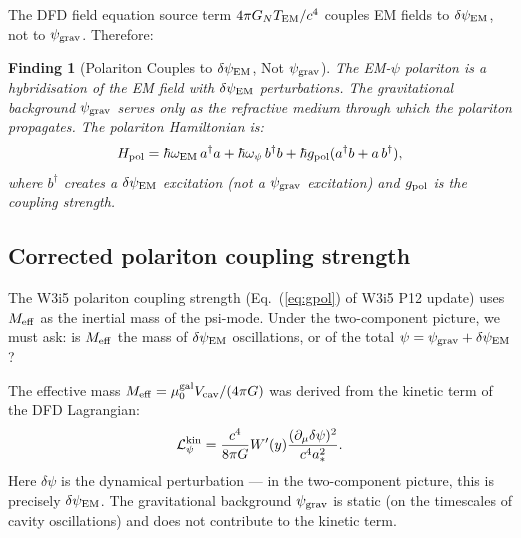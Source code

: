 \documentclass[11pt]{article}
\newtheorem{finding}{Finding}
\newcommand{\psigrav}{\psi_{\rm grav}}
\newcommand{\dpsiEM}{\delta\psi_{\rm EM}}
\newcommand{\Meff}{M_{\rm eff}}
\newcommand{\GN}{G_N}
\begin{document}
The DFD field equation source term $4\pi \GN T_{\rm EM}/c^4$ couples
EM fields to $\dpsiEM$, not to $\psigrav$. Therefore:

\begin{finding}[Polariton Couples to $\dpsiEM$, Not $\psigrav$]
\label{find:polariton-dpsi}
The EM-$\psi$ polariton is a hybridisation of the EM field with
$\dpsiEM$ perturbations. The gravitational background $\psigrav$
serves only as the refractive medium through which the polariton
propagates. The polariton Hamiltonian is:
\begin{equation}
H_{\rm pol} = \hbar\omega_{\rm EM}\,a^\dagger a
+ \hbar\omega_\psi\,b^\dagger b
+ \hbar g_{\rm pol}(a^\dagger b + a\,b^\dagger),
\label{eq:H-polariton}
\end{equation}
where $b^\dagger$ creates a $\dpsiEM$ excitation (not a $\psigrav$
excitation) and $g_{\rm pol}$ is the coupling strength.
\end{finding}

\subsection{Corrected polariton coupling strength}

The W3i5 polariton coupling strength (Eq.~(\ref{eq:gpol}) of W3i5
P12 update) uses $\Meff$ as the inertial mass of the psi-mode.
Under the two-component picture, we must ask: is $\Meff$ the mass
of $\dpsiEM$ oscillations, or of the total $\psi = \psigrav + \dpsiEM$?

The effective mass $\Meff = \mu_0^{\rm gal}V_{\rm cav}/(4\pi G)$
was derived from the kinetic term of the DFD Lagrangian:
\begin{equation}
\mathcal{L}_\psi^{\rm kin} = \frac{c^4}{8\pi G}W'(y)
\frac{(\partial_\mu\delta\psi)^2}{c^4 a_*^2}.
\end{equation}
Here $\delta\psi$ is the dynamical perturbation --- in the two-component
picture, this is precisely $\dpsiEM$. The gravitational background
$\psigrav$ is static (on the timescales of cavity oscillations) and
does not contribute to the kinetic term.
\end{document}
